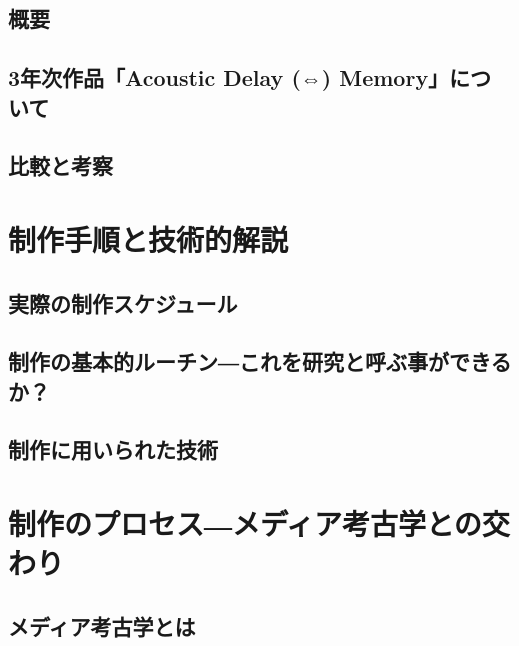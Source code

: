 \section{概要}\label{ux6982ux8981}

\section{3年次作品「Acoustic Delay (⇔)
Memory」について}\label{ux5e74ux6b21ux4f5cux54c1acoustic-delay-memoryux306bux3064ux3044ux3066}

\section{比較と考察}\label{ux6bd4ux8f03ux3068ux8003ux5bdf}

\chapter{制作手順と技術的解説}\label{ux5236ux4f5cux624bux9806ux3068ux6280ux8853ux7684ux89e3ux8aac}

\section{実際の制作スケジュール}\label{ux5b9fux969bux306eux5236ux4f5cux30b9ux30b1ux30b8ux30e5ux30fcux30eb}

\section{制作の基本的ルーチン―これを研究と呼ぶ事ができるか？}\label{ux5236ux4f5cux306eux57faux672cux7684ux30ebux30fcux30c1ux30f3ux3053ux308cux3092ux7814ux7a76ux3068ux547cux3076ux4e8bux304cux3067ux304dux308bux304b}

\section{制作に用いられた技術}\label{ux5236ux4f5cux306bux7528ux3044ux3089ux308cux305fux6280ux8853}

\chapter{制作のプロセス―メディア考古学との交わり}\label{ux5236ux4f5cux306eux30d7ux30edux30bbux30b9ux30e1ux30c7ux30a3ux30a2ux8003ux53e4ux5b66ux3068ux306eux4ea4ux308fux308a}

\section{メディア考古学とは}\label{ux30e1ux30c7ux30a3ux30a2ux8003ux53e4ux5b66ux3068ux306f}

